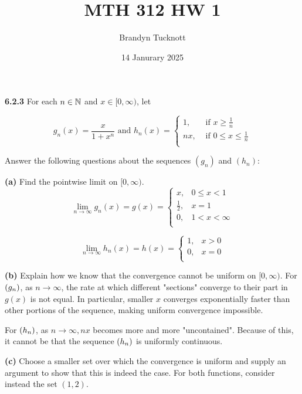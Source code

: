 \documentclass{exam}
\title{MTH 312 HW 1}
\author{Brandyn Tucknott}
\date{14 Janurary 2025}
\begin{document}
\maketitle

\begin{questions}
    \textbf{6.2.3}
For each $n \in \mathbb {N}$ and $x \in [0, \infty)$, let

$$g_n(x) = \frac{x}{1 + x^n} \text{ and } h_n(x) =
\begin{cases}
    1, & \text{ if } x \geq \frac{1}{n} \\
    nx, & \text{ if } 0 \leq x \leq \frac{1}{n} \\
\end{cases}$$

Answer the following questions about the sequences $(g_n)$ and $(h_n)$:

\newline
\textbf{(a) }
Find the pointwise limit on $[0, \infty)$.
\sol
$$\lim_{n \rightarrow \infty} g_n(x) = g(x) =
\begin{cases}
    x, & 0 \leq x < 1 \\
    \frac{1}{2}, & x = 1 \\
    0, & 1 < x < \infty \\
\end{cases}$$

$$\lim_{n \rightarrow \infty} h_n(x) = h(x) =
\begin{cases}
    1, & x > 0 \\
    0, & x = 0 \\
\end{cases}$$


\newline
\textbf{(b) }
Explain how we know that the convergence cannot be uniform on $[0, \infty)$.
\sol
For $\left( g_n \right)$, as $n \rightarrow \infty$, the rate at which different "sections" converge to their part in $g(x)$ is not equal. In particular, smaller $x$ converges exponentially faster than other portions of the sequence, making uniform convergence impossible.

\newline\newline

For $\left( h_n \right)$, as $n \rightarrow \infty, nx$ becomes more and more "uncontained". Because of this, it cannot be that the sequence $\left( h_n \right)$ is uniformly continuous.


\newline
\newline
\textbf{(c) }
Choose a smaller set over which the convergence is uniform and supply an argument to show that this is indeed the case.
\sol
For both functions, consider instead the set $(1, 2)$. 


\end{questions}
\end{document}
